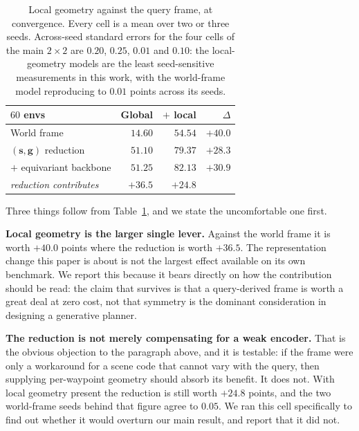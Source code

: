 \documentclass[10pt,twocolumn,letterpaper]{article}
\newcommand{\toprule}{\hline}
\newcommand{\midrule}{\hline}
\newcommand{\bottomrule}{\hline}
\theoremstyle{plain}
\newcommand{\svec}{\mathbf{s}}
\newcommand{\gvec}{\mathbf{g}}
\begin{document}
\begin{table}[t]
\centering
\small
\begin{tabular}{@{}l r r r@{}}
\toprule
$60$ envs & Global & $+$ local & $\Delta$ \\
\midrule
World frame                     & $14.60$ & $54.54$ & $+40.0$ \\
$(\svec,\gvec)$ reduction       & $51.10$ & $79.37$ & $+28.3$ \\
\quad $+$ equivariant backbone  & $51.25$ & $\mathbf{82.13}$ & $+30.9$ \\
\midrule
\emph{reduction contributes}    & $+36.5$ & $+24.8$ & \\
\bottomrule
\end{tabular}
\caption{Local geometry against the query frame, at convergence. Every cell is a
mean over two or three seeds. Across-seed standard errors for the four cells of
the main $2\times2$ are $0.20$, $0.25$, $0.01$ and $0.10$: the local-geometry
models are the least seed-sensitive measurements in this work, with the
world-frame model reproducing to $0.01$ points across its seeds.}
\label{tab:localgeom}
\end{table}

Three things follow from Table~\ref{tab:localgeom}, and we state the
uncomfortable one first.

\textbf{Local geometry is the larger single lever.} Against the world frame it
is worth $+40.0$ points where the reduction is worth $+36.5$. The
representation change this paper is about is not the largest effect available on
its own benchmark. We report this because it bears directly on how the
contribution should be read: the claim that survives is that a query-derived
frame is worth a great deal at zero cost, not that symmetry is the dominant
consideration in designing a generative planner.

\textbf{The reduction is not merely compensating for a weak encoder.} That is
the obvious objection to the paragraph above, and it is testable: if the frame
were only a workaround for a scene code that cannot vary with the query, then
supplying per-waypoint geometry should absorb its benefit. It does not. With
local geometry present the reduction is still worth $+24.8$ points, and the two
world-frame seeds behind that figure agree to $0.05$. We ran this cell
specifically to find out whether it would overturn our main result, and report
that it did not.
\end{document}
